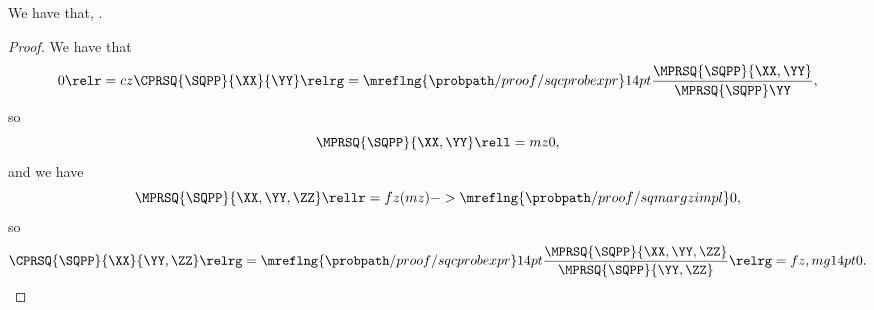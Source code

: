 \begin{proposition}
  We have that, \sqppzerocindprop.%
\end{proposition}

\begin{proof}
  We have that 
  $$0 \relr = cz \CPRSQ{\SQPP}{\XX}{\YY} \relrg = {\mreflng{\probpath/proof/sqcprobexpr}} 14pt \frac{\MPRSQ{\SQPP}{\XX, \YY}}{\MPRSQ{\SQPP}\YY},$$
  so 
  $$\MPRSQ{\SQPP}{\XX, \YY} \rell = mz 0,$$
  and we have
  $$\MPRSQ{\SQPP}{\XX, \YY, \ZZ} \rellr = fz (mz)->{\mreflng{\probpath/proof/sqmargzimpl}} 0,$$
  so
  $$\CPRSQ{\SQPP}{\XX}{\YY, \ZZ} \relrg = {\mreflng{\probpath/proof/sqcprobexpr}} 14pt \frac{\MPRSQ{\SQPP}{\XX, \YY, \ZZ}}{\MPRSQ{\SQPP}{\YY,\ZZ}} \relrg = fz,mg 14pt 0.$$
\end{proof}
